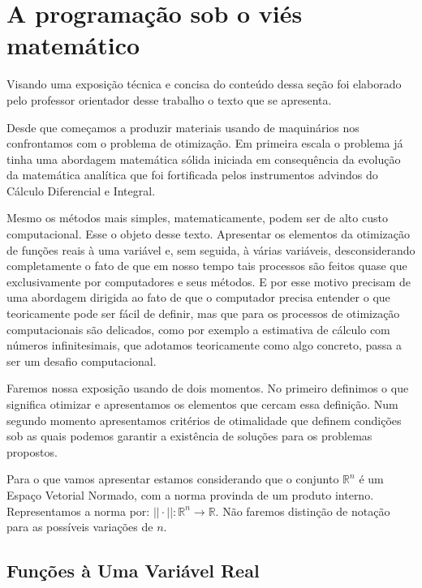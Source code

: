 \section{A programação sob o viés matemático}

\noindent
Visando uma exposição técnica e concisa do conteúdo dessa seção foi elaborado pelo professor orientador desse trabalho o texto que se apresenta.

\par Desde que começamos a produzir materiais usando de maquinários nos confrontamos com o problema de otimização. Em primeira escala o problema já tinha uma abordagem matemática sólida iniciada em consequência da evolução da matemática analítica que foi fortificada pelos instrumentos advindos do Cálculo Diferencial e Integral. 

\par Mesmo os métodos mais simples, matematicamente, podem ser de alto custo computacional. Esse o objeto desse texto. Apresentar os elementos da otimização de funções reais à uma variável e, sem seguida, à várias variáveis, desconsiderando completamente o fato de que em nosso tempo tais processos são feitos quase que exclusivamente por computadores e seus métodos. E por esse motivo precisam de uma abordagem dirigida ao fato de que o computador precisa entender o que teoricamente pode ser fácil de definir, mas que para os processos de otimização computacionais são delicados, como por exemplo a estimativa de cálculo com números infinitesimais, que adotamos teoricamente como algo concreto, passa a ser um desafio computacional. 
\par Faremos nossa exposição usando de dois momentos. No primeiro definimos o que significa otimizar e apresentamos os elementos que cercam essa definição. Num segundo momento apresentamos critérios de otimalidade que definem condições sob as quais podemos garantir a existência de soluções para os problemas propostos.
\par Para o que vamos apresentar estamos considerando que o conjunto $\mathbb{R}^n$ é um Espaço Vetorial Normado, com a norma provinda de um produto interno. Representamos a norma por: $||\cdot ||: \mathbb{R}^n \rightarrow \mathbb{R}$. Não faremos distinção de notação para as possíveis variações de $n$.

\subsection{Funções à Uma Variável Real}

